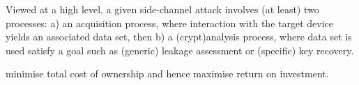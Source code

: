 Viewed at a high level, a given side-channel attack involves (at least) two 
processes:
a) an acquisition    process, 
   where interaction with the target device yields an associated data set,
   then
b) a (crypt)analysis process,
   where data set is used satisfy a goal such as 
    (generic) leakage assessment
   or 
   (specific) key recovery.

%
%
%
%

 minimise total cost of ownership
and hence maximise return on investment.

